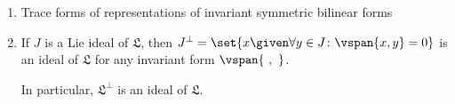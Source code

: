 \begin{enumerate}[label=(\roman*)]
	\item Trace forms of representations of invariant symmetric bilinear forms
	\item If $J$ is a Lie ideal of $\mathfrak{L}$, then $J^{\perp} = \set{x\given \forall y \in J\colon \vspan{x, y} = 0}$
		is an ideal of $\mathfrak{L}$ for any invariant form $\vspan{\ ,\ }$.

		In particular, $\mathfrak{L}^{\perp}$ is an ideal of $\mathfrak{L}$.
\end{enumerate}
